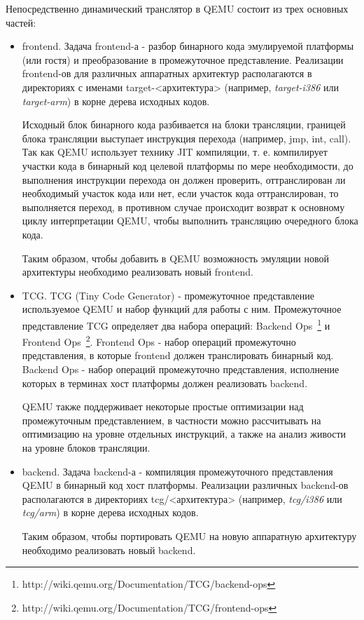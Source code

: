 Непосредственно динамический транслятор в QEMU состоит из трех основных частей:

\begin{itemize}

    \item frontend. Задача frontend-а - разбор бинарного кода эмулируемой платформы (или гостя) и преобразование в промежуточное представление. Реализации frontend-ов для различных аппаратных архитектур располагаются в директориях с именами target-<архитектура> (например, \textit{target-i386} или \textit{target-arm}) в корне дерева исходных кодов.

    Исходный блок бинарного кода разбивается на блоки трансляции, границей блока трансляции выступает инструкция перехода (например, jmp, int, call). Так как QEMU использует технику JIT компиляции, т. е. компилирует участки кода в бинарный код целевой платформы по мере необходимости, до выполнения инструкции перехода он должен проверить, оттранслирован ли необходимый участок кода или нет, если участок кода оттранслирован, то выполняется переход, в противном случае происходит возврат к основному циклу интерпретации QEMU, чтобы выполнить трансляцию очередного блока кода.

    Таким образом, чтобы добавить в QEMU возможность эмуляции новой архитектуры необходимо реализовать новый frontend.

    \item TCG. TCG (Tiny Code Generator) - промежуточное представление используемое QEMU и набор функций для работы с ним. Промежуточное представление TCG определяет два набора операций: Backend Ops~\footnote{http://wiki.qemu.org/Documentation/TCG/backend-ops} и Frontend Ops~\footnote{http://wiki.qemu.org/Documentation/TCG/frontend-ops}. Frontend Ops - набор операций промежуточно представления, в которые frontend должен транслировать бинарный код. Backend Ops - набор операций промежуточно представления, исполнение которых в терминах хост платформы должен реализовать backend.

    QEMU также поддерживает некоторые простые оптимизации над промежуточным представлением, в частности можно рассчитывать на оптимизацию на уровне отдельных инструкций, а также на анализ живости на уровне блоков трансляции.

    \item backend. Задача backend-а - компиляция промежуточного представления QEMU в бинарный код хост платформы. Реализации различных backend-ов располагаются в директориях tcg/<архитектура> (например, \textit{tcg/i386} или \textit{tcg/arm}) в корне дерева исходных кодов.

    Таким образом, чтобы портировать QEMU на новую аппаратную архитектуру необходимо реализовать новый backend.

\end{itemize}

